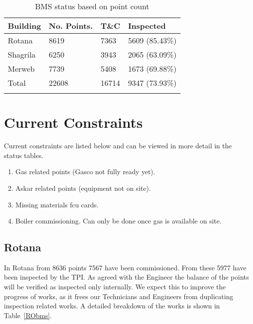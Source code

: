 \begin{table}[htbp]
\begin{tabular}{llll}
\toprule
Building   &No. Points. &T\&C &Inspected\\
\midrule
Rotana     & 8619       &7363     & 5609 (85.43\%) \\
Shagrila   & 6250       &3943     & 2065 (63.09\%) \\
Merweb     & 7739       &5408     & 1673 (69.88\%) \\
\midrule
Total      &22608       &16714    &9347  (73.93\%) \\
\bottomrule 
\caption{BMS status based on point count}
\label{tbl:bmsstatus}
\end{tabular}
\end{table}

\section{Current Constraints} 

Current constraints are listed below and can be viewed in more detail
in the status tables.

\begin{enumerate}
\item Gas related points (Gasco not fully ready yet).
\item Askar related points (equipment not on site).
\item Missing materials fcu cards.
\item Boiler commissioning. Can only be done once gas is available on
      site.
\end{enumerate}

\subsection{Rotana}
In Rotana from 8636 points 7567 have been commissioned. From these 5977 have been inspected by the TPI. As agreed with the Engineer the balance of the points will be verified as inspected only internally. We expect this to improve the progress of works, as it frees our Technicians and Engineers from duplicating inspection related works. A detailed breakdown of the works is shown in Table~\ref{RObms}. 
\bigskip



